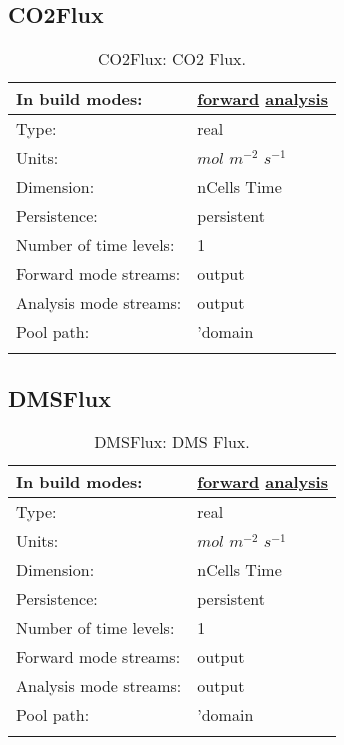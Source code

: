 \subsection[CO2Flux]{CO2Flux}
\label{subsec:var_sec_forcing_CO2Flux}
\begin{center}
\begin{longtable}{| p{2.0in} | p{4.0in} |}
        \hline 
        In build modes: & \hyperref[subsec:forward_var_tab_forcing]{forward} \hyperref[subsec:analysis_var_tab_forcing]{analysis} \\
        \hline 
        Type: & real \\
        \hline 
        Units: & $mol$ $m^{-2}$ $s^{-1}$ \\
        \hline 
        Dimension: & nCells Time \\
        \hline 
        Persistence: & persistent \\
        \hline 
        Number of time levels: & 1 \\
        \hline 
		 Forward mode streams: &  output \\
        \hline 
		 Analysis mode streams: &  output \\
        \hline 
            Pool path: & 'domain %
 \\
		 \hline 
    \caption{CO2Flux: CO2 Flux.}
\end{longtable}
\end{center}
\subsection[DMSFlux]{DMSFlux}
\label{subsec:var_sec_forcing_DMSFlux}
\begin{center}
\begin{longtable}{| p{2.0in} | p{4.0in} |}
        \hline 
        In build modes: & \hyperref[subsec:forward_var_tab_forcing]{forward} \hyperref[subsec:analysis_var_tab_forcing]{analysis} \\
        \hline 
        Type: & real \\
        \hline 
        Units: & $mol$ $m^{-2}$ $s^{-1}$ \\
        \hline 
        Dimension: & nCells Time \\
        \hline 
        Persistence: & persistent \\
        \hline 
        Number of time levels: & 1 \\
        \hline 
		 Forward mode streams: &  output \\
        \hline 
		 Analysis mode streams: &  output \\
        \hline 
            Pool path: & 'domain %
 \\
		 \hline 
    \caption{DMSFlux: DMS Flux.}
\end{longtable}
\end{center}
